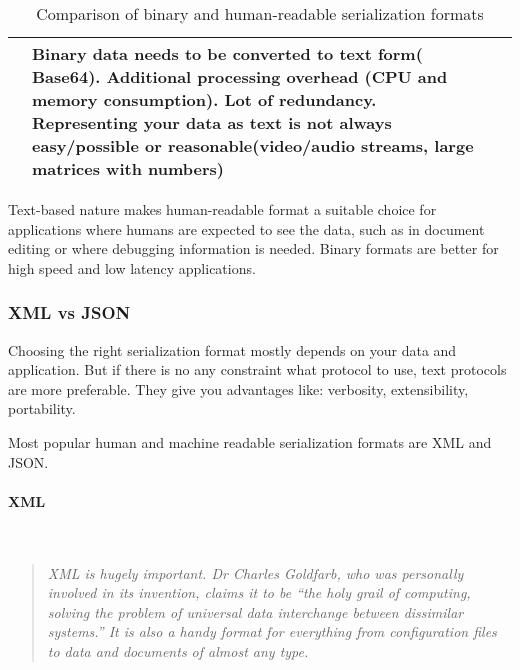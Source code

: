 \begin{table}[H]
\begin{tabularx}{\textwidth}{|X|X|X|}
		&
		
		Binary data needs to be converted to text form( Base64). \newline
		Additional processing overhead (CPU and memory consumption). \newline
		Lot of redundancy.
		Representing your data as text is not always easy/possible or
		reasonable(video/audio streams, large matrices with numbers)
				
				
		\tabularnewline
		\hline
	\end{tabularx} 
	\caption{Comparison of binary and human-readable serialization formats}
	\label{tbl:data_ser_formats}
\end{table}

Text-based nature makes human-readable format a suitable choice
for applications where humans are expected to see the data,
such as in document editing or where debugging information
is needed. Binary formats are better for high speed and low latency
applications.

\subsubsection{XML vs JSON}
\label{sec:xml_vs_json}
Choosing the right serialization format mostly depends on your data and
application. But if there is no any constraint what protocol to use, text
protocols are more preferable. They give you advantages like: verbosity,
extensibility, portability.

Most popular human and machine readable serialization formats are XML and JSON.

\paragraph{XML} ~\\
\begin{quotation}
\textit{
XML is hugely important. Dr Charles Goldfarb, who was personally involved in its
invention, claims it to be “the holy grail of computing, solving the problem of universal data interchange between dissimilar systems.” It is also a handy format for everything from configuration files to data and documents of almost any type.
~\cite{xml_intro}}
\end{quotation} 


